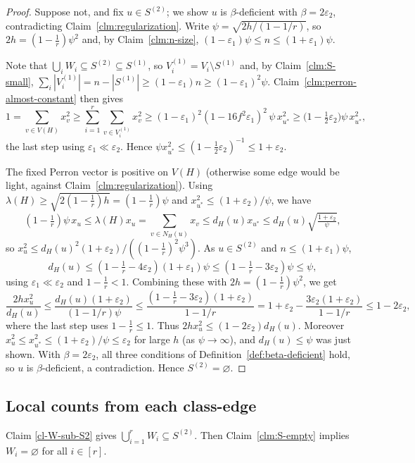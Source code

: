 \documentclass[11pt,a4paper]{article}
\theoremstyle{definition}
\theoremstyle{plain}
\newcommand{\eps}{\varepsilon}
\renewcommand{\le}{\leqslant}
\renewcommand{\ge}{\geqslant}
\begin{document}
\begin{proof}
Suppose not, and fix $u\in S^{(2)}$; we show $u$ is $\beta$-deficient with $\beta=2\eps_2$,
contradicting Claim~\ref{clm:regularization}. Write $\psi=\sqrt{2h/(1-1/r)}$, so $2h=(1-\frac1r)\psi^2$ and, by
Claim~\ref{clm:n-size}, $(1-\eps_1)\psi\le n\le(1+\eps_1)\psi$.

Note that $\bigcup_iW_i\subseteq S^{(2)}\subseteq S^{(1)}$, so $V_i^{(1)}=V_i\setminus S^{(1)}$ and,
by Claim~\ref{clm:S-small}, $\sum_i|V_i^{(1)}|=n-|S^{(1)}|\ge(1-\eps_1)n\ge(1-\eps_1)^2\psi$.
Claim~\ref{clm:perron-almost-constant} then gives
\[
  1=\sum_{v\in V(H)}x_v^2\ge\sum_{i=1}^r\sum_{v\in V_i^{(1)}}x_v^2
  \ge(1-\eps_1)^2(1-16f^2\eps_1)^2\,\psi\,x_{u^\ast}^2\ge\Big(1-\tfrac12\eps_2\Big)\psi\,x_{u^\ast}^2,
\]
the last step using $\eps_1\ll\eps_2$. Hence $\psi x_{u^\ast}^2\le(1-\tfrac12\eps_2)^{-1}\le1+\eps_2$.

The fixed Perron vector is positive on $V(H)$ (otherwise some edge would be light, against
Claim~\ref{clm:regularization}). Using $\lambda(H)\ge\sqrt{2(1-\frac1r)h}=(1-\frac1r)\psi$ and
$x_{u^\ast}^2\le(1+\eps_2)/\psi$, we have 
\[
  (1-\tfrac1r)\psi\,x_u\le\lambda(H)x_u=\sum_{v\in N_H(u)}x_v\le d_H(u)x_{u^\ast}
  \le d_H(u)\sqrt{\tfrac{1+\eps_2}{\psi}},
\]
so $x_u^2\le d_H(u)^2(1+\eps_2)/((1-\frac1r)^2\psi^3)$. As $u\in S^{(2)}$ and $n\le(1+\eps_1)\psi$, 
\[
  d_H(u)\le\left(1-\tfrac1r-4\eps_2\right) 
  (1+\eps_1)\psi 
  \le \left(1-\tfrac1r-3\eps_2 \right) \psi\le\psi,
\]
using $\eps_1\ll\eps_2$ and $1-\frac1r<1$. Combining these with $2h=(1-\frac1r)\psi^2$, we get 
\[
  \frac{2hx_u^2}{d_H(u)}\le\frac{d_H(u)(1+\eps_2)}{(1-1/r)\psi}
  \le\frac{(1-\frac1r-3\eps_2)(1+\eps_2)}{1-1/r}
  =1+\eps_2-\frac{3\eps_2(1+\eps_2)}{1-1/r}\le1-2\eps_2,
\]
where the last step uses $1-\frac1r\le1$. Thus $2hx_u^2\le(1-2\eps_2)d_H(u)$. Moreover
$x_u^2\le x_{u^\ast}^2\le(1+\eps_2)/\psi\le\eps_2$ for large $h$ (as $\psi\to\infty$), and
$d_H(u)\le\psi$ was just shown. With $\beta=2\eps_2$, all three conditions of
Definition~\ref{def:beta-deficient} hold, so $u$ is $\beta$-deficient, a contradiction. Hence
$S^{(2)}=\varnothing$.
\end{proof}




\subsection{Local counts from each class-edge}


Claim \ref{cl-W-sub-S2} gives  $\bigcup_{i=1}^r W_i\subseteq S^{(2)}$. Then Claim~\ref{clm:S-empty}  implies $ W_i=\varnothing$ for all $i\in [r]$.  
\end{document}
